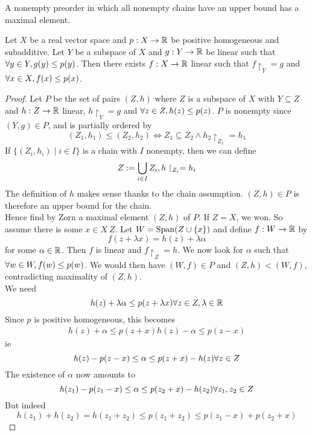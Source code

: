 \documentclass{article}
\begin{document}
\begin{fact}
  A nonempty preorder in which all nonempty chains have an upper bound has a maximal element.
\end{fact}

\begin{thm}\label{thm:hb-positive}
  Let $X$ be a real vector space and $p : X \to \mathbb R$ be positive homogeneous and subadditive. Let $Y$ be a subspace of $X$ and $g : Y \to \mathbb R$ be linear such that $\forall y \in Y, g(y) \le p(y)$. Then there exists $f : X \to \mathbb R$ linear such that $f\restriction_Y = g$ and $\forall x \in X, f(x) \le p(x)$.
\end{thm}
\begin{proof}
  Let $P$ be the set of pairs $(Z, h)$ where $Z$ is a subspace of $X$ with $Y \subseteq Z$ and $h : Z \to \mathbb R$ linear, $h\restriction_Y = g$ and $\forall z \in Z, h(z) \le p(z)$. $P$ is nonempty since $(Y, g) \in P$, and is partially ordered by
  $$(Z_1, h_1) \le (Z_2, h_2) \iff Z_1 \subseteq Z_2 \land h_2\restriction_{Z_1} = h_1$$
  If $\{(Z_i, h_i) \mid i \in I\}$ is a chain with $I$ nonempty, then we can define
  $$Z := \bigcup_{i \in I} Z_i, h\restriction_{Z_i} = h_i$$
  The definition of $h$ makes sense thanks to the chain assumption. $(Z, h) \in P$ is therefore an upper bound for the chain. \\
  Hence find by Zorn a maximal element $(Z, h)$ of $P$. If $Z = X$, we won. So assume there is some $x \in X \ Z$. Let $W = \operatorname{Span}(Z \cup \{x\})$ and define $f : W \to \mathbb R$ by
  $$f(z + \lambda x) = h(z) + \lambda\alpha$$
  for some $\alpha \in \mathbb R$. Then $f$ is linear and $f\restriction_Z = h$. We now look for $\alpha$ such that $\forall w \in W, f(w) \le p(w)$. We would then have $(W, f) \in P$ and $(Z, h) < (W, f)$, contradicting maximality of $(Z, h)$. \\
  We need
  $$h(z) + \lambda\alpha \le p(z + \lambda x) \forall z \in Z, \lambda \in \mathbb R$$
  Since $p$ is positive homogeneous, this becomes
  \begin{align}
    h(z) + \alpha \le p(z + x)
    h(z) - \alpha \le p(z - x)
  \end{align}
  ie
  $$h(z) - p(z - x) \le \alpha \le p(z + x) - h(z) \forall z \in Z$$
  The existence of $\alpha$ now amounts to
  $$h(z_1) - p(z_1 - x) \le \alpha \le p(z_2 + x) - h(z_2) \forall z_1, z_2 \in Z$$
  But indeed
  $$h(z_1) + h(z_2) = h(z_1 + z_2) \le p(z_1 + z_2) \le p(z_1 - x) + p(z_2 + x)$$
\end{proof}
\end{document}
